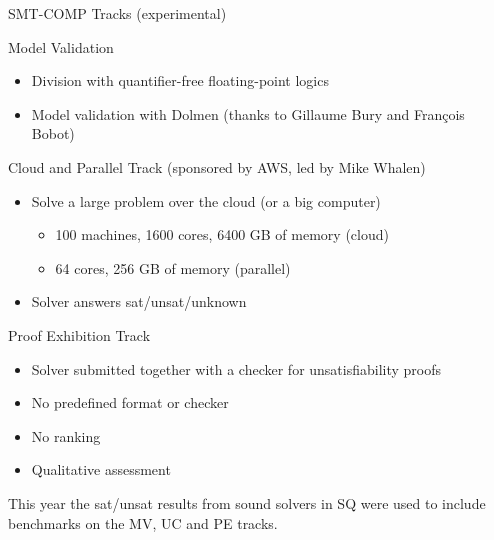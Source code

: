\documentclass[table]{beamer}
\def\emph#1{\textcolor{MYblue}{#1}}
\begin{document}
\begin{frame}[fragile]{SMT-COMP Tracks (experimental)}

  \emph{Model Validation}
  \begin{itemize}
    \item Division with quantifier-free floating-point logics
    \item Model validation with Dolmen (thanks to Gillaume Bury and Fran\c{c}ois
    Bobot)
  \end{itemize}
  \bigskip

  \emph{Cloud and Parallel Track} (sponsored by AWS, led by Mike Whalen)
  \begin{itemize}
  \item Solve a large problem over the cloud (or a big computer)
  \begin{itemize}
    \item 100 machines, 1600 cores, 6400 GB of memory (cloud)
    \item 64 cores, 256 GB of memory (parallel)
  \end{itemize}
  \item Solver answers sat/unsat/unknown
  \end{itemize}

  \pause\bigskip

  \emph{Proof Exhibition Track}
  \begin{itemize}
  \item Solver submitted together with a checker for unsatisfiability proofs
  \item No predefined format or checker
  \item No ranking
  \item Qualitative assessment
\end{itemize}

\medskip
\pause
  \emph{This year} the sat/unsat results from sound solvers in SQ were used to
  include benchmarks on the MV, UC and PE tracks.

\end{frame}
\end{document}
